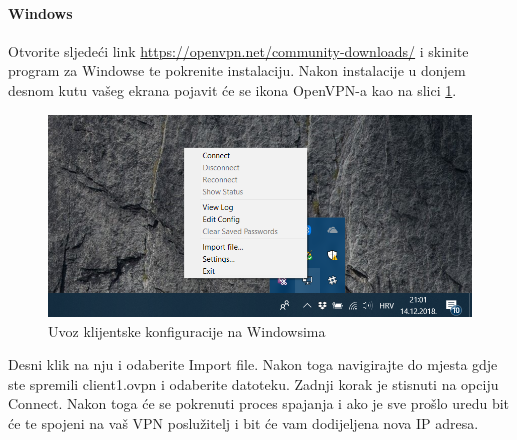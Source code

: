 \paragraph*{Windows}
\hfill \smallbreak
Otvorite sljedeći link \url{https://openvpn.net/community-downloads/} i skinite program za Windowse te pokrenite instalaciju. Nakon instalacije u donjem desnom kutu vašeg ekrana pojavit će se ikona OpenVPN-a kao na slici \ref{fig:win-open-vpn-2}.
\begin{figure}[h]
	\centering
	\includegraphics[width=0.7\linewidth]{slike/OpenVPN/win-open-vpn-2}
	\caption[Uvoz klijentske konfiguracije na Windowsima]{Uvoz klijentske konfiguracije na Windowsima}
	\label{fig:win-open-vpn-2}
\end{figure}
Desni klik na nju i odaberite Import file. Nakon toga navigirajte do mjesta gdje ste spremili client1.ovpn i odaberite datoteku. Zadnji korak je stisnuti na opciju Connect. Nakon toga će se pokrenuti proces spajanja i ako je sve prošlo uredu bit će te spojeni na vaš VPN poslužitelj i bit će vam dodijeljena nova IP adresa.

\bigbreak

